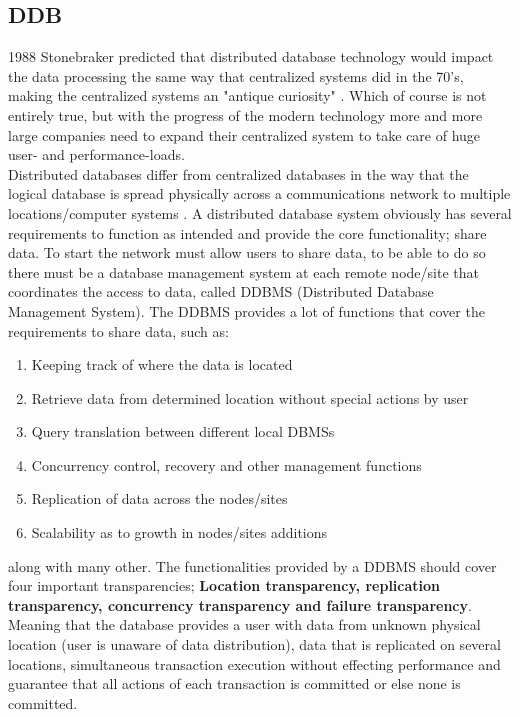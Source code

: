 \documentclass{cslthse-msc}
\begin{document}
\subsection{DDB}
1988 Stonebraker predicted that distributed database technology would impact the data processing the same way that centralized systems did in the 70's, making the centralized systems an "antique curiosity"  \cite{DDBMSvsCDBMS}. Which of course is not entirely true, but with the progress of the modern technology more and more large companies need to expand their centralized system to take care of huge user- and performance-loads.\\  
Distributed databases differ from centralized databases in the way that the logical database is spread physically across a communications network to multiple locations/computer systems \cite{DDBMS}. A distributed database system obviously has several requirements to function as intended and provide the core functionality; share data. To start the network must allow users to share data, to be able to do so there must be a database management system at each remote node/site that coordinates the access to data, called DDBMS (Distributed Database Management System). The DDBMS provides a lot of functions that cover the requirements to share data, such as: \begin{enumerate}
\item Keeping track of where the data is located
\item Retrieve data from determined location without special actions by user
\item Query translation between different local DBMSs
\item Concurrency control, recovery and other management functions
\item Replication of data across the nodes/sites
\item Scalability as to growth in nodes/sites additions \begin{flushright}  \cite{functionsDDBMS}
\cite{datareplication}   \end{flushright}
\end{enumerate}      
along with many other. The functionalities provided by a DDBMS should cover four important transparencies; \textbf{Location transparency, replication transparency, concurrency transparency and failure transparency}. Meaning that the database provides a user with data from unknown physical location (user is unaware of data distribution), data that is replicated on several locations, simultaneous transaction execution without effecting performance and guarantee that all actions of each transaction is committed or else none is committed.\\\\
\end{document}

